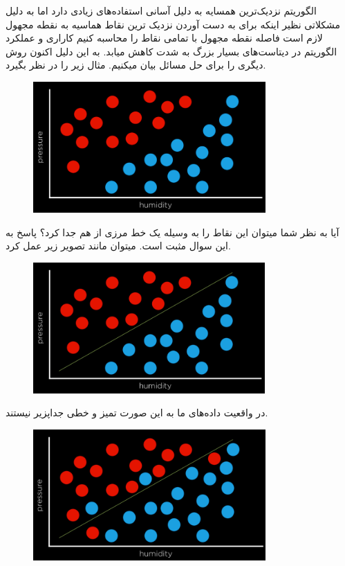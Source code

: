 \documentclass[a4paper, titlepage]{article}
\begin{document}
\clearpage
الگوریتم  نزدیک‌ترین همسایه به دلیل آسانی استفاده‌های زیادی دارد اما به دلیل مشکلاتی نظیر اینکه برای به دست آوردن نزدیک ترین نقاط هماسیه به نقطه مجهول لازم است فاصله نقطه مجهول با تمامی نقاط را محاسبه کنیم کاراری و عملکرد الگوریتم در دیتاست‌های بسیار بزرگ به شدت کاهش میابد. به این دلیل اکنون روش دیگری را برای حل مسائل  بیان میکنیم. مثال زیر را در نظر بگیرد.

\begin{figure}[H]
    \center
    \includegraphics[height=5cm]{Classification-img17.png}
    \label{Classification-img17}
    \caption{}
\end{figure}

آیا به نظر شما میتوان این نقاط را به وسیله یک خط مرزی از هم جدا کرد؟ پاسخ به این سوال مثبت است. میتوان مانند تصویر زیر عمل کرد.

\begin{figure}[H]
    \center
    \includegraphics[height=5cm]{Classification-img18.png}
    \label{Classification-img18}
    \caption{}
\end{figure}

در واقعیت داده‌های ما به این صورت تمیز و خطی جداپزیر  نیستند.   

\begin{figure}[H]
    \center
    \includegraphics[height=5cm]{Classification-img19.png}
    \label{Classification-img19}
    \caption{}
\end{figure}
\end{document}
